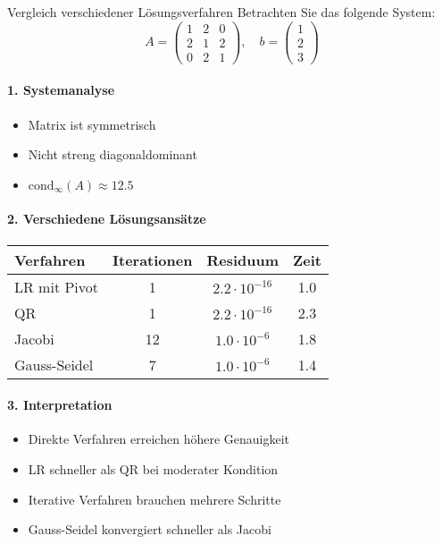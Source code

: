 \begin{example2}{Vergleich verschiedener Lösungsverfahren}
Betrachten Sie das folgende System:
$$A = \begin{pmatrix}
1 & 2 & 0\\
2 & 1 & 2\\
0 & 2 & 1
\end{pmatrix}, \quad b = \begin{pmatrix}
1\\
2\\
3
\end{pmatrix}$$

\paragraph{1. Systemanalyse}
\begin{itemize}
    \item Matrix ist symmetrisch
    \item Nicht streng diagonaldominant
    \item $\text{cond}_\infty(A) \approx 12.5$
\end{itemize}

\paragraph{2. Verschiedene Lösungsansätze}
\begin{center}
\begin{tabular}{l|ccc}
Verfahren & Iterationen & Residuum & Zeit\\
\hline
LR mit Pivot & 1 & $2.2\cdot10^{-16}$ & 1.0\\
QR & 1 & $2.2\cdot10^{-16}$ & 2.3\\
Jacobi & 12 & $1.0\cdot10^{-6}$ & 1.8\\
Gauss-Seidel & 7 & $1.0\cdot10^{-6}$ & 1.4\\
\end{tabular}
\end{center}

\paragraph{3. Interpretation}
\begin{itemize}
    \item Direkte Verfahren erreichen höhere Genauigkeit
    \item LR schneller als QR bei moderater Kondition
    \item Iterative Verfahren brauchen mehrere Schritte
    \item Gauss-Seidel konvergiert schneller als Jacobi
\end{itemize}
\end{example2}



